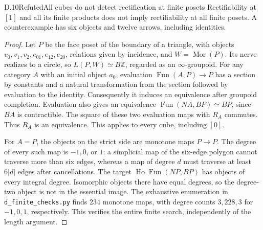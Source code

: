 \begin{result}{D.10}{Refuted}{All cubes do not detect rectification at finite posets}
Rectifiability at $[1]$ and all its finite products does not imply
rectifiability at all finite posets. A counterexample has six objects
and twelve arrows, including identities.
\end{result}
\begin{proof}
Let $P$ be the face poset of the boundary of a triangle, with objects
$v_0,v_1,v_2,e_{01},e_{12},e_{20}$, relations given by incidence,
and $W=\operatorname{Mor}(P)$. Its nerve realizes to a circle, so
$L(P,W)\simeq B\mathbb Z$, regarded as an $\infty$-groupoid.
For any category $A$ with an initial object $a_0$, evaluation
$\operatorname{Fun}(A,P)\to P$ has a section by constants and a natural
transformation from the section followed by evaluation to the identity.
Consequently it induces an equivalence after groupoid completion.
Evaluation also gives an equivalence
$\operatorname{Fun}(NA,BP)\simeq BP$, since $BA$ is contractible.
The square of these two evaluation maps with $R_A$ commutes. Thus
$R_A$ is an equivalence. This applies to every cube, including $[0]$.

For $A=P$, the objects on the strict side are monotone maps $P\to P$.
The degree of every such map is $-1,0$, or $1$: a simplicial map of the
six-edge polygon cannot traverse more than six edges, whereas a map of
degree $d$ must traverse at least $6|d|$ edges after cancellations.
The target $\operatorname{Ho}\operatorname{Fun}(NP,BP)$ has objects
of every integral degree. Isomorphic objects there have equal degrees,
so the degree-two object is not in the essential image. The exhaustive
enumeration in \texttt{d\_finite\_checks.py} finds 234 monotone maps,
with degree counts $3,228,3$ for $-1,0,1$, respectively. This verifies
the entire finite search, independently of the length argument.
\end{proof}

